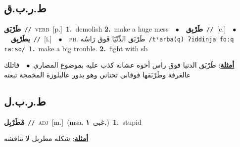 \documentclass[10pt,a4paper,twoside]{article} %
\begin{document}
\begin{multicols}{2}
\vspace{-3mm}
\subsection*{\color{blue}\foreignlanguage{arabic}{ط.ر.ب.ق}\color{blue}{}} 

{\setlength\topsep{0pt}\textbf{\foreignlanguage{arabic}{طَرْبَق}}\ {\color{gray}\texttt{//}\color{black}}\ \textsc{verb}\ [p.]\ \textbf{1.}~demolish  \textbf{2.}~make a huge mess\ \ $\bullet$\ \ \setlength\topsep{0pt}\textbf{\foreignlanguage{arabic}{طَرْبِق}}\ {\color{gray}\texttt{//}\color{black}}\ [c.]\ \ $\bullet$\ \ \setlength\topsep{0pt}\textbf{\foreignlanguage{arabic}{يطَرْبِق}}\ {\color{gray}\texttt{//}\color{black}}\ [i.]\ \ $\bullet$\ \ \textsc{ph.} \color{gray} \foreignlanguage{arabic}{طَرْبَق الدِّنْيَا فَوق رَاسُه}\color{black}\ {\color{gray}\texttt{/{\sffamily tˤarba(q) ʔiddinja foːq raːso}/}\color{black}}\ \textbf{1.}~make a big trouble.  \textbf{2.}~fight with sb\  \begin{flushright}\color{gray}\foreignlanguage{arabic}{\textbf{\underline{\foreignlanguage{arabic}{أمثلة}}}: طَرْبَق الدنيا فوق راس أخوه عشانه كذب عليه بموضوع المصاري\ $\bullet$\ \  فاتلك عالغرفة وطَرْبَقها فوقاني تحتاني وهو يدور عالبلوزة المخمجة تبعته}\end{flushright}\color{black}} \vspace{2mm}

\vspace{-3mm}
\subsection*{\color{blue}\foreignlanguage{arabic}{ط.ر.ب.ل}\color{blue}{}} 

{\setlength\topsep{0pt}\textbf{\foreignlanguage{arabic}{مْطَرْبِل}}\ {\color{gray}\texttt{//}\color{black}}\ \textsc{adj}\ [m.]\ \color{gray}(msa. \foreignlanguage{arabic}{غبي}~\foreignlanguage{arabic}{\textbf{١.}})\color{black}\ \textbf{1.}~stupid\  \begin{flushright}\color{gray}\foreignlanguage{arabic}{\textbf{\underline{\foreignlanguage{arabic}{أمثلة}}}: شكله مطربل لا تناقشه}\end{flushright}\color{black}} \vspace{2mm}


\end{multicols}
\end{document}
